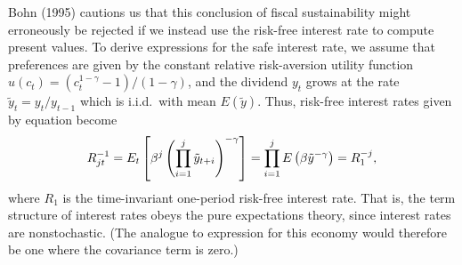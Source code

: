 Bohn (1995) cautions us that this conclusion of fiscal sustainability might
erroneously be rejected if we instead use the risk-free interest rate to
compute present values. To derive expressions for the safe interest rate,
we assume that preferences are given by the constant relative risk-aversion
utility function $u(c_t)=(c_t^{1-\gamma}-1)/(1-\gamma)$, and the dividend $y_t$
grows at the rate $\tilde y_t=y_t/y_{t-1}$ which is i.i.d.\ with mean
$E(\tilde y)$. Thus, risk-free interest rates given by equation
 become
$$
R_{jt}^{-1} = E_t \left[ {\beta}^j \left( \prod_{i=1}^j \tilde y_{t+i} \right)^{-\gamma}
                                                                         \right]
            = \prod_{i=1}^j E \left( {\beta} \tilde y^{-\gamma} \right)
 = R_{1}^{-j},
$$
where $R_{1}$ is the time-invariant one-period risk-free interest rate.
That is, the term structure of interest rates obeys the pure expectations
theory, since interest rates are nonstochastic. (The analogue to
expression  for this economy would therefore be one where the
covariance term is zero.)

